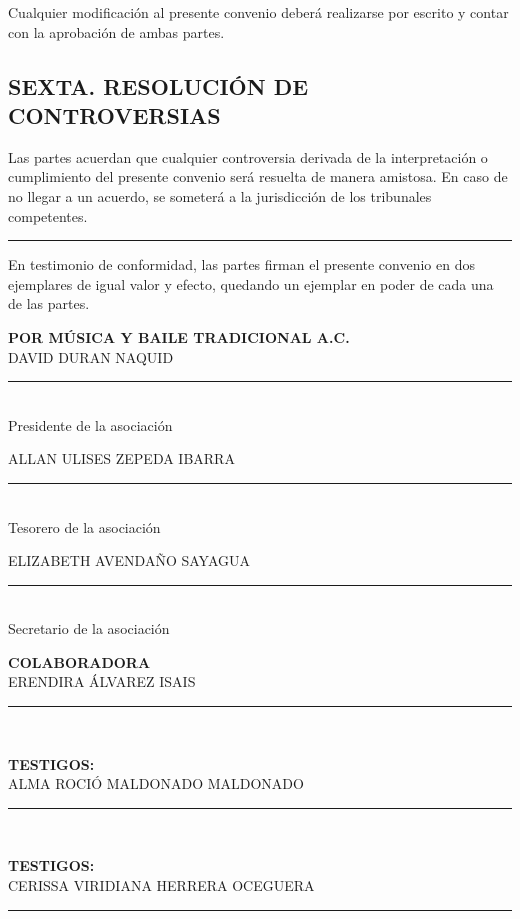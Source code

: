 \documentclass[a4paper,12pt]{article}
\begin{document}
Cualquier modificación al presente convenio deberá realizarse por escrito y contar con la aprobación de ambas partes.

\subsection*{SEXTA. RESOLUCIÓN DE CONTROVERSIAS}

Las partes acuerdan que cualquier controversia derivada de la interpretación o cumplimiento del presente convenio será resuelta de manera amistosa. En caso de no llegar a un acuerdo, se someterá a la jurisdicción de los tribunales competentes.

\vspace{0.5cm}
\hrule
\vspace{0.5cm}

En testimonio de conformidad, las partes firman el presente convenio en dos ejemplares de igual valor y efecto, quedando un ejemplar en poder de cada una de las partes.

\vspace{1cm}

\textbf{POR MÚSICA Y BAILE TRADICIONAL A.C.} \\

DAVID DURAN NAQUID \\
\rule{10cm}{0.4pt} \\
Presidente de la asociación

\vspace{1cm}

ALLAN ULISES ZEPEDA IBARRA \\
\rule{10cm}{0.4pt} \\
Tesorero de la asociación

\vspace{1cm}

ELIZABETH AVENDAÑO SAYAGUA\\
\rule{10cm}{0.4pt} \\
Secretario de la asociación

\vspace{1cm}

\textbf{COLABORADORA} \\

ERENDIRA ÁLVAREZ ISAIS\\
\rule{10cm}{0.4pt} \\

\vspace{1cm}

\textbf{TESTIGOS:} \\[0.5cm]
ALMA ROCIÓ MALDONADO MALDONADO \\
\rule{10cm}{0.4pt} \\

\vspace{1cm}

\textbf{TESTIGOS:} \\[0.5cm]
CERISSA VIRIDIANA HERRERA OCEGUERA \\
\rule{10cm}{0.4pt} \\
\end{document}

